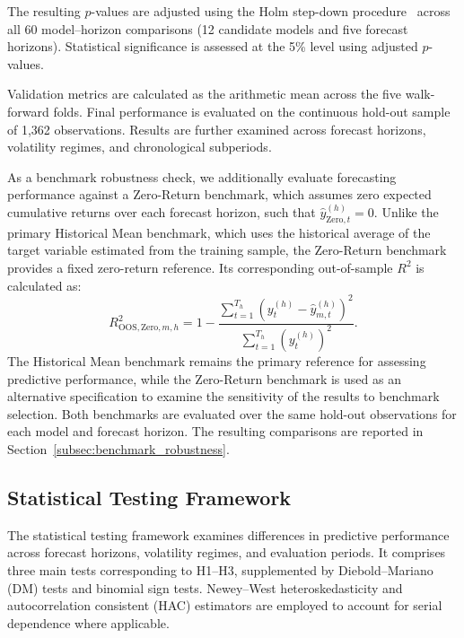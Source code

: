\documentclass[runningheads,orivec]{llncs}
\begin{document}
The resulting $p$-values are adjusted using the Holm step-down procedure~\cite{holm1979} across all 60 model--horizon comparisons (12 candidate models and five forecast horizons). Statistical significance is assessed at the 5\% level using adjusted $p$-values.

Validation metrics are calculated as the arithmetic mean across the five walk-forward folds. Final performance is evaluated on the continuous hold-out sample of 1,362 observations. Results are further examined across forecast horizons, volatility regimes, and chronological subperiods.

As a benchmark robustness check, we additionally evaluate forecasting performance against a Zero-Return benchmark, which assumes zero expected cumulative returns over each forecast horizon, such that \(\hat{y}^{(h)}_{\mathrm{Zero},t}=0\). Unlike the primary Historical Mean benchmark, which uses the historical average of the target variable estimated from the training sample, the Zero-Return benchmark provides a fixed zero-return reference. Its corresponding out-of-sample \(R^2\) is calculated as:
\begin{equation}
R^2_{\mathrm{OOS,Zero},m,h} = 1 - \frac{\sum_{t=1}^{T_h}\left(y_t^{(h)}-\hat{y}_{m,t}^{(h)}\right)^2}{\sum_{t=1}^{T_h}\left(y_t^{(h)}\right)^2}.
\end{equation}
The Historical Mean benchmark remains the primary reference for assessing predictive performance, while the Zero-Return benchmark is used as an alternative specification to examine the sensitivity of the results to benchmark selection. Both benchmarks are evaluated over the same hold-out observations for each model and forecast horizon. The resulting comparisons are reported in Section~\ref{subsec:benchmark_robustness}.

\subsection{Statistical Testing Framework}\label{subsec:hypothesis_testing}

The statistical testing framework examines differences in predictive performance across forecast horizons, volatility regimes, and evaluation periods. It comprises three main tests corresponding to H1--H3, supplemented by Diebold--Mariano (DM) tests and binomial sign tests. Newey--West heteroskedasticity and autocorrelation consistent (HAC) estimators are employed to account for serial dependence where applicable.
\end{document}
